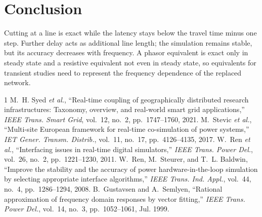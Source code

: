 \documentclass[conference]{IEEEtran}
\begin{document}
\section{Conclusion}
Cutting at a line is exact while the latency stays below the travel time minus one step. Further delay acts as additional line length; the simulation remains stable, but its accuracy decreases with frequency. A phasor equivalent is exact only in steady state and a resistive equivalent not even in steady state, so equivalents for transient studies need to represent the frequency dependence of the replaced network.

\begin{thebibliography}{1}
 M.~H. Syed \emph{et al.}, ``Real-time coupling of geographically distributed research infrastructures: Taxonomy, overview, and real-world smart grid applications,'' \emph{IEEE Trans. Smart Grid}, vol.~12, no.~2, pp.~1747--1760, 2021.
 M.~Stevic \emph{et al.}, ``Multi-site European framework for real-time co-simulation of power systems,'' \emph{IET Gener. Transm. Distrib.}, vol.~11, no.~17, pp.~4126--4135, 2017.
 W.~Ren \emph{et al.}, ``Interfacing issues in real-time digital simulators,'' \emph{IEEE Trans. Power Del.}, vol.~26, no.~2, pp.~1221--1230, 2011.
 W.~Ren, M.~Steurer, and T.~L. Baldwin, ``Improve the stability and the accuracy of power hardware-in-the-loop simulation by selecting appropriate interface algorithms,'' \emph{IEEE Trans. Ind. Appl.}, vol.~44, no.~4, pp.~1286--1294, 2008.
 B.~Gustavsen and A.~Semlyen, ``Rational approximation of frequency domain responses by vector fitting,'' \emph{IEEE Trans. Power Del.}, vol.~14, no.~3, pp.~1052--1061, Jul. 1999.
\end{thebibliography}
\end{document}
